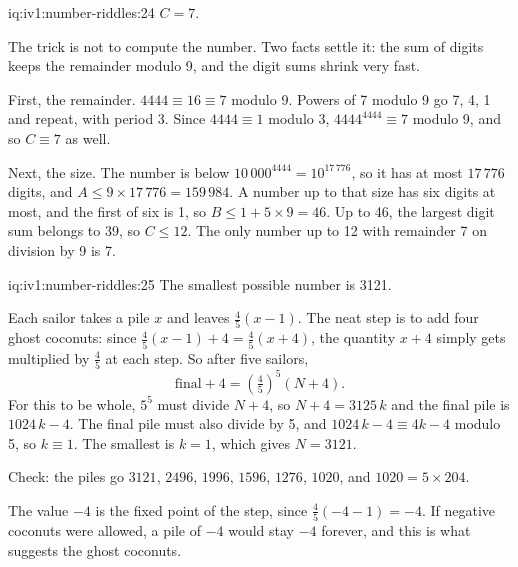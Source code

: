 \begin{solution}{iq:iv1:number-riddles:24}
$C = 7$.

The trick is not to compute the number. Two facts settle it: the sum of digits keeps the remainder modulo 9, and the digit sums shrink very fast.

First, the remainder. $4444 \equiv 16 \equiv 7$ modulo 9. Powers of 7 modulo 9 go 7, 4, 1 and repeat, with period 3. Since $4444 \equiv 1$ modulo 3, $4444^{4444} \equiv 7$ modulo 9, and so $C \equiv 7$ as well.

Next, the size. The number is below $10\,000^{4444} = 10^{17\,776}$, so it has at most $17\,776$ digits, and $A \le 9 \times 17\,776 = 159\,984$. A number up to that size has six digits at most, and the first of six is 1, so $B \le 1 + 5 \times 9 = 46$. Up to 46, the largest digit sum belongs to 39, so $C \le 12$. The only number up to 12 with remainder 7 on division by 9 is 7.

\end{solution}

\begin{solution}{iq:iv1:number-riddles:25}
The smallest possible number is 3121.

Each sailor takes a pile $x$ and leaves $\tfrac45(x - 1)$. The neat step is to add four ghost coconuts: since $\tfrac45(x - 1) + 4 = \tfrac45(x + 4)$, the quantity $x + 4$ simply gets multiplied by $\tfrac45$ at each step. So after five sailors,
\[
\text{final} + 4 = \left(\tfrac45\right)^5 (N + 4).
\]
For this to be whole, $5^5$ must divide $N + 4$, so $N + 4 = 3125\,k$ and the final pile is $1024\,k - 4$. The final pile must also divide by 5, and $1024\,k - 4 \equiv 4k - 4$ modulo 5, so $k \equiv 1$. The smallest is $k = 1$, which gives $N = 3121$.

Check: the piles go $3121$, $2496$, $1996$, $1596$, $1276$, $1020$, and $1020 = 5 \times 204$.

The value $-4$ is the fixed point of the step, since $\tfrac45(-4 - 1) = -4$. If negative coconuts were allowed, a pile of $-4$ would stay $-4$ forever, and this is what suggests the ghost coconuts.

\end{solution}
